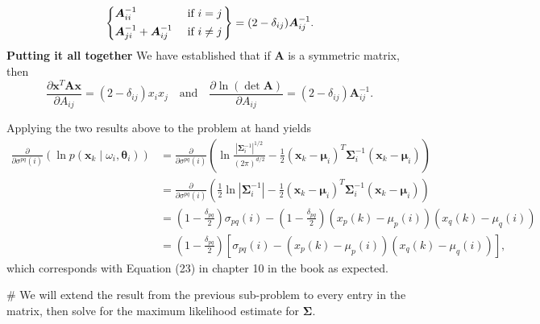 \documentclass[12pt, a4paper]{article}
\newcommand{\vect}[1]{\bm{#1}}
\newcommand{\abs}[1]{\left\lvert#1\right\rvert}
\begin{document}
{\begin{easylist}[enumerate]
\begin{equation*}
\begin{rcases}
\begin{dcases}
\vect{A}^{-1}_{ii}  & \text{ if } i = j \\
\vect{A}^{-1}_{ji} + \vect{A}^{-1}_{ij}   & \text{ if } i \neq j
\end{dcases}
\end{rcases}
=
(2 - \delta_{ij}) \vect{A}^{-1}_{ij}.
\end{equation*}
\textbf{Putting it all together}
We have established that if $\vect{A}$ is a symmetric matrix, then
\begin{equation*}
	\frac{\partial \vect{x}^T \vect{A} \vect{x}}{\partial A_{ij}} 
	= 
	\left(2 - \delta_{ij}\right) x_i x_j
	\quad \text{and} \quad
	\frac{\partial \ln \left( \det \vect{A} \right)}{\partial A_{ij}} 
	=
	(2 - \delta_{ij}) \vect{A}^{-1}_{ij}.
\end{equation*}

Applying the two results above to the problem at hand yields
\begin{align*}
	\frac{\partial }{\partial \sigma^{pq}(i)} \left( \ln p \left( \vect{x}_k \mid \omega_i , \vect{\theta}_i \right) \right)
	& =
	\frac{\partial }{\partial \sigma^{pq}(i)} \left(
	\ln \frac{\abs{\vect{\Sigma}_i^{-1}}^{1/2}}{(2 \pi)^{d/2}}
	 - \frac{1}{2}
	 \left( \vect{x}_k - \vect{\mu}_i \right)^T
	 \vect{\Sigma}_i^{-1}
	 \left( \vect{x}_k - \vect{\mu}_i \right)
	 \right) \\
	 & =
	 \frac{\partial }{\partial \sigma^{pq}(i)} \left(
	 \frac{1}{2}\ln \abs{\vect{\Sigma}_i^{-1}}
	 - \frac{1}{2}
	 \left( \vect{x}_k - \vect{\mu}_i \right)^T
	 \vect{\Sigma}_i^{-1}
	 \left( \vect{x}_k - \vect{\mu}_i \right)
	 \right) \\
	 & =
	 \left(1 - \frac{\delta_{pq}}{2} \right) \sigma_{pq}(i)
	 -
	 \left(1 - \frac{\delta_{pq}}{2} \right)
	 \left( x_p(k) - \mu_p(i) \right)
	 \left( x_q(k) - \mu_q(i) \right) \\
	 & =
	 \left(1 - \frac{\delta_{pq}}{2} \right) 
	 \left[
	 \sigma_{pq}(i)
	 - 
	 \left( x_p(k) - \mu_p(i) \right)
	 \left( x_q(k) - \mu_q(i) \right)
	 \right],
\end{align*}
which corresponds with Equation (23) in chapter 10 in the book as expected.

# We will extend the result from the previous sub-problem to every entry in the matrix, then solve for the maximum likelihood estimate for $\vect{\Sigma}$.


\end{easylist}}
\end{document}
